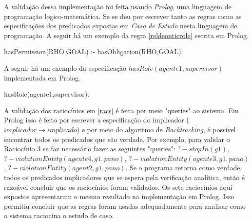 A validação dessa implementação foi feita usando \textit{Prolog}, uma linguagem de programação logico-matemática. Se se deu por escrever tanto as regras como as especificações dos predicados expostas em \textit{Caso de Estudo} nesta linguagem de programação. A seguir há um exemplo da regra \ref{reldeonticrole} escrita em Prolog.

hasPermission(RHO,GOAL) :- hasObligation(RHO,GOAL).

A seguir há um exemplo da especificação $hasRole(agente1,supervisor)$ implementada em Prolog.

hasRole(agente1,supervisor).

A validação dos raciocínios em \ref{racs} é feita por meio "queries" ao sistema. Em Prolog isso é feito por escrever a especificação do implicador ($implicador \to implicado$) e por meio do algoritmo de \textit{Backtracking}, é possível encontrar todos os predicados que são verdade. Por exemplo, para validar o Raciocínio 3 se faz necessário fazer as seguintes "queries": $? - stopIn(g1)$, $? - violationEntity(agente4,g1,pano)$, $? - violationEntity(agente3,g1,pano)$, $? - violationEntity(agent2,g1,pano)$. Se o programa retorna como verdade todos os predicados implicadores que se espera pela verificação analítica, então é razoável concluir que os raciocínios foram validados. Os sete raciocínios aqui expostos apresentaram o mesmo resultado na implementação em Prolog. Isso permitiu concluir que as regras foram usadas adequadamente para analisar como o sistema raciocina o estudo de caso. 